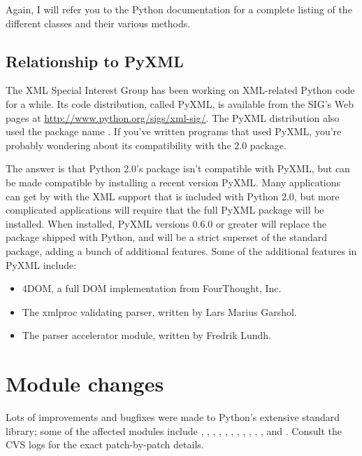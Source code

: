 \documentclass{howto}
\begin{document}
Again, I will refer you to the Python documentation for a complete
listing of the different  classes and their various methods.

\subsection{Relationship to PyXML}

The XML Special Interest Group has been working on XML-related Python
code for a while.  Its code distribution, called PyXML, is available
from the SIG's Web pages at \url{http://www.python.org/sigs/xml-sig/}.
The PyXML distribution also used the package name .  If
you've written programs that used PyXML, you're probably wondering
about its compatibility with the 2.0  package.

The answer is that Python 2.0's  package isn't compatible
with PyXML, but can be made compatible by installing a recent version
PyXML.  Many applications can get by with the XML support that is
included with Python 2.0, but more complicated applications will
require that the full PyXML package will be installed.  When
installed, PyXML versions 0.6.0 or greater will replace the
 package shipped with Python, and will be a strict
superset of the standard package, adding a bunch of additional
features.  Some of the additional features in PyXML include:

\begin{itemize}
\item 4DOM, a full DOM implementation
from FourThought, Inc.
\item The xmlproc validating parser, written by Lars Marius Garshol.
\item The  parser accelerator module, written by Fredrik Lundh.
\end{itemize}

\section{Module changes}

Lots of improvements and bugfixes were made to Python's extensive
standard library; some of the affected modules include
, , ,
, , , ,
, , , ,
and .  Consult the CVS logs for the exact
patch-by-patch details.  
\end{document}
